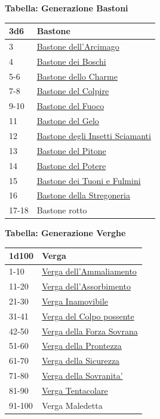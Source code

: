 \begin{multicols}{2}
{\medskip

\textbf{Tabella: Generazione Bastoni}\hypertarget{Bastoni}{}

\medskip

{\small\begin{tabularx}{\linewidth}{ll}
		\toprule
\textbf{3d6} & \textbf{Bastone}\\
\toprule
3 & \hyperlink{Bastone dell'Arcimago}{Bastone dell'Arcimago}\\
4 & \hyperlink{Bastone dei Boschi}{Bastone dei Boschi}\\
5-6 & \hyperlink{Bastone dello Charme}{Bastone dello Charme}\\
7-8 & \hyperlink{Bastone del Colpire}{Bastone del Colpire}\\
9-10 & \hyperlink{Bastone del Fuoco}{Bastone del Fuoco}\\
11 & \hyperlink{Bastone del Gelo}{Bastone del Gelo}\\
12 & \hyperlink{Bastoned egli Insetti Sciamanti}{Bastone degli Insetti Sciamanti}\\
13 & \hyperlink{Bastone del Pitone}{Bastone del Pitone}\\
14 & \hyperlink{Bastone del Potere}{Bastone del Potere}\\
15 & \hyperlink{Bastone dei Tuoni e Fulmini}{Bastone dei Tuoni e Fulmini}\\
16 & \hyperlink{Bastone della Stregoneria}{Bastone della Stregoneria}\\
17-18 & Bastone rotto\\
\end{tabularx}}

\medskip

\textbf{Tabella: Generazione Verghe}\hypertarget{Verghe}{}

\medskip

{\small\begin{tabularx}{\linewidth}{ll}
		\toprule
\textbf{1d100} & \textbf{Verga}\\
\toprule
1-10 & \hyperlink{Verga dell'Ammaliamento}{Verga dell'Ammaliamento}\\
11-20 & \hyperlink{Verga dell'Assorbimento}{Verga dell'Assorbimento}\\
21-30 & \hyperlink{Verga Inamovibile}{Verga Inamovibile}\\
31-41 & \hyperlink{Verga del Colpo possente}{Verga del Colpo possente}\\
42-50 & \hyperlink{Verga della Forza Sovrana}{Verga della Forza Sovrana}\\
51-60 & \hyperlink{Verga della Prontezza}{Verga della Prontezza}\\
61-70 & \hyperlink{Verga della Sicurezza}{Verga della Sicurezza}\\
71-80 & \hyperlink{Verga della Sovranita'}{Verga della Sovranita'}\\
81-90 & \hyperlink{Verga Tentacolare}{Verga Tentacolare}\\
91-100 & Verga Maledetta\\
\end{tabularx}}

}
\end{multicols}
